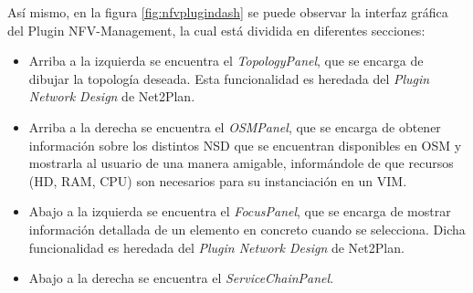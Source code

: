 Así mismo, en la figura \ref{fig:nfvplugindash} se puede observar la interfaz gráfica del Plugin NFV-Management, la cual está dividida en diferentes secciones:

\begin{itemize}
	\item Arriba a la izquierda se encuentra el \textit{TopologyPanel}, que se encarga de dibujar la topología deseada. Esta funcionalidad es heredada del \textit{Plugin Network Design} de Net2Plan.
	
	\item Arriba a la derecha se encuentra el \textit{OSMPanel}, que se encarga de obtener información sobre los distintos NSD que se encuentran disponibles en OSM y mostrarla al usuario de una manera amigable, informándole de que recursos (HD, RAM, CPU) son necesarios para su instanciación en un VIM.
	
	\item Abajo a la izquierda se encuentra el \textit{FocusPanel}, que se encarga de mostrar información detallada de un elemento en concreto cuando se selecciona. Dicha funcionalidad es heredada del \textit{Plugin Network Design} de Net2Plan.
	
	\item Abajo a la derecha se encuentra el \textit{ServiceChainPanel}.
\end{itemize}




\cleardoublepage